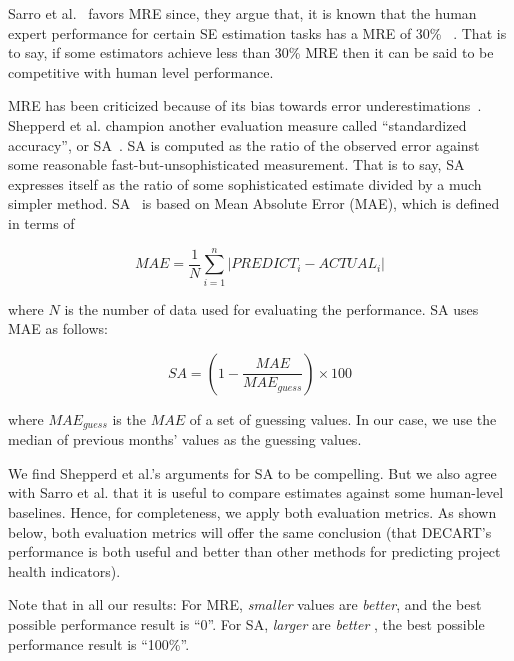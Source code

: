 \documentclass[smallextended]{svjour3}
\newcommand{\bi}{\begin{itemize}}
\newcommand{\ei}{\end{itemize}}
\newcommand{\BLUE}{\color{blue}}
\newcommand{\BLACK}{\color{black}}
\begin{document}
Sarro et al.~\cite{sarro2016multi} favors MRE
since, they argue that, it is known that the human expert performance
for certain SE estimation tasks  has a MRE of 30\% ~\cite{molokken2003review}. That is to say, if some estimators achieve less than 30\% MRE then it can be said to be competitive with human level performance.  




MRE has been criticized because of its bias towards error underestimations~\cite{foss2003simulation,kitchenham2001accuracy,korte2008confidence,port2008comparative,shepperd2000building,stensrud2003further}.  
Shepperd et al. champion another evaluation measure called ``standardized accuracy'', or SA~\cite{shepperd2012evaluating}.
SA is computed as the ratio of the observed error against some reasonable fast-but-unsophisticated measurement. That is to say, 
SA expresses itself as the ratio of some sophisticated estimate
divided by a much simpler method.
SA~\cite{langdon2016exact,shepperd2012evaluating} is based on Mean Absolute Error (MAE), which is defined in terms of 

\[
\mathit{MAE}=\frac{1}{N}\sum_{i=1}^n|\mathit{PREDICT}_i-\mathit{ACTUAL}_i|
\]

where $N$ is the number of data used for evaluating the performance. SA uses MAE as follows:

\[
\mathit{SA} = (1-\frac{\mathit{MAE}}{\mathit{MAE}_{guess}})\times 100
\]

where $\mathit{MAE}_{guess}$ is the $\mathit{MAE}$ of a set of guessing values. In our case, we use the median of previous months' values as the guessing values.
\BLACK

We find Shepperd et al.'s arguments for SA to be compelling. But we also agree with Sarro et al. that it is useful to   compare estimates against some human-level baselines. Hence, for completeness, we apply both evaluation metrics. As shown below, both evaluation metrics will offer the same conclusion (that DECART's performance is both useful and better than other  methods for predicting project health indicators).

Note that in all our results: For MRE, {\em smaller}  values are {\em better}, and the best possible performance result is ``0''. For SA,  {\em larger} are {\em better }, the best possible performance result is ``100\%''.
\end{document}
